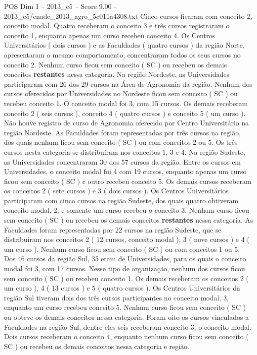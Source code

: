 \begin{textsample}{POS Dim 1 – 2013\_c5 – Score 9.00 – 2013\_c5/enade\_2013\_agro\_5c011a4308.txt}
Cinco cursos ficaram com conceito 2, conceito modal.
Quatro receberam o conceito 3 e três cursos registraram o conceito 1, enquanto apenas um curso recebeu conceito 4.
Os Centros Universitários ( dois cursos ) e as Faculdades ( quatro cursos ) da região Norte, apresentaram o mesmo comportamento, concentraram todos os seus cursos no conceito 2.
Nenhum curso ficou sem conceito ( SC ) ou recebeu os demais conceitos \textbf{restantes} nessa categoria.
Na região Nordeste, as Universidades participaram com 26 dos 29 cursos na Área de Agronomia da região.
Nenhum dos cursos oferecidos por Universidades no Nordeste ficou sem conceito ( SC ) ou recebeu conceito 1.
O conceito modal foi 3, com 15 cursos.
Os demais receberam conceito 2 ( seis cursos ), conceito 4 ( quatro cursos ) e conceito 5 ( um curso ).
Não houve registro de curso de Agronomia oferecido por Centro Universitário na região Nordeste.
As Faculdades foram representadas por três cursos na região, dos quais nenhum ficou sem conceito ( SC ) ou com conceitos 2 ou 5.
Os três cursos nesta categoria se distribuíram nos conceitos 1, 3 e 4.
Na região Sudeste, as Universidades concentraram 30 dos 57 cursos da região.
Entre os cursos em Universidades, o conceito modal foi 4 com 19 cursos, enquanto apenas um curso ficou sem conceito ( SC ) e outro recebeu conceito 5.
Os demais cursos receberam os conceitos 2 ( sete cursos ) e 3 ( dois cursos ).
Os Centros Universitários participaram com cinco cursos na região Sudeste, dos quais quatro obtiveram conceito modal, 2, e somente um curso recebeu o conceito 3.
Nenhum curso ficou sem conceito ( SC ) ou recebeu os demais conceitos \textbf{restantes} nessa categoria.
As Faculdades foram representadas por 22 cursos na região Sudeste, que se distribuíram nos conceitos 2 ( 12 cursos, conceito modal ), 3 ( nove cursos ) e 4 ( um curso ).
Nenhum curso ficou sem conceito ( SC ) ou com conceitos 1 ou 5.
Dos 46 cursos da região Sul, 35 eram de Universidades, para os quais o conceito modal foi 3, com 17 cursos.
Nesse tipo de organização, nenhum dos cursos ficou sem conceito ( SC ) ou recebeu conceito 1.
Os demais receberam os conceitos 2 ( um curso ), 4 ( 13 cursos ) e 5 ( quatro cursos ).
Os Centros Universitários da região Sul tiveram dois dos três cursos participantes no conceito modal, 3, enquanto um curso recebeu conceito 5.
Nenhum curso ficou sem conceito ( SC ) ou obteve os demais conceitos nessa categoria.
Foram oito os cursos vinculados a Faculdades na região Sul, dentre eles seis receberam conceito 3, o conceito modal.
Dois cursos receberam o conceito 4, enquanto nenhum curso ficou sem conceito ( SC ) ou recebeu os demais conceitos nessa categoria e região.

\end{textsample}
